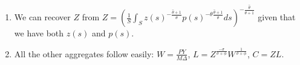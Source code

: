 \documentclass[12pt]{article}%
\begin{document}
\begin{enumerate}
    \item We can recover $Z$ from $Z = \left(\frac{1}{S} \int_S z(s)^{-\frac{\hat{\theta} + 1}{\hat{\theta}}} p(s)^{-\theta \frac{\hat{\theta}+1}{\hat{\theta}}} ds \right)^{-\frac{\hat{\theta}}{\hat{\theta} + 1}}$ given that we have both $z(s)$ and $p(s)$.
    \item All the other aggregates follow easily: $W = \frac{P Y}{M \Delta}$, $L = Z^{\frac{-\sigma}{\sigma + \phi}} W^{\frac{1}{\sigma+\phi}}$, $C = Z L$.

\end{enumerate}









\newpage

{\color{blue}
% 
}
\end{document}
